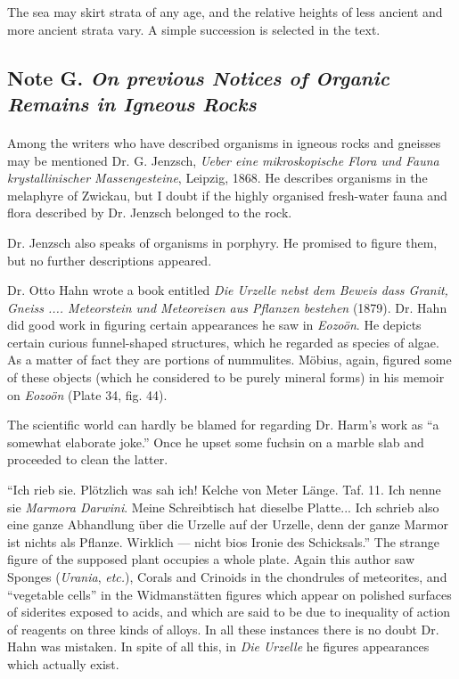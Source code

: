 \documentclass[a4paper, 12pt, oneside]{article}
\begin{document}
The sea may skirt strata of any age, and the relative heights of less ancient and more ancient strata vary. A simple succession is selected in the text.

\subsection{Note G. \emph{On previous Notices of Organic Remains in Igneous Rocks}}
\paragraph{}
Among the writers who have described organisms in igneous rocks and gneisses may be mentioned Dr. G. Jenzsch, \emph{Ueber eine mikroskopische Flora und Fauna krystallinischer Massengesteine}, Leipzig, 1868. He describes organisms in the melaphyre of Zwickau, but I doubt if the highly organised fresh-water fauna and flora described by Dr. Jenzsch belonged to the rock.

Dr. Jenzsch also speaks of organisms in porphyry. He promised to figure them, but no further descriptions appeared.

Dr. Otto Hahn wrote a book entitled \emph{Die Urzelle nebst dem Beweis dass Granit, Gneiss .... Meteorstein und Meteoreisen aus Pflanzen bestehen} (1879). Dr. Hahn did good work in figuring certain appearances he saw in \emph{Eozoön}. He depicts certain curious funnel-shaped structures, which he regarded as species of algae. As a matter of fact they are portions of nummulites. Möbius, again, figured some of these objects (which he considered to be purely mineral forms) in his memoir on \emph{Eozoön} (Plate 34, fig. 44).

The scientific world can hardly be blamed for regarding Dr. Harm's work as ``a somewhat elaborate joke.'' Once he upset some fuchsin on a marble slab and proceeded to clean the latter.

``Ich rieb sie. Plötzlich was sah ich! Kelche von Meter Länge. Taf. 11. Ich nenne sie \emph{Marmora Darwini}. Meine Schreibtisch hat dieselbe Platte... Ich schrieb also eine ganze Abhandlung über die Urzelle auf der Urzelle, denn der ganze Marmor ist nichts als Pflanze. Wirklich --- nicht bios Ironie des Schicksals.'' The strange figure of the supposed plant occupies a whole plate. Again this author saw Sponges (\emph{Urania}, \emph{etc.}), Corals and Crinoids in the chondrules of meteorites, and ``vegetable cells'' in the Widmanstätten figures which appear on polished surfaces of siderites exposed to acids, and which are said to be due to inequality of action of reagents on three kinds of alloys. In all these instances there is no doubt Dr. Hahn was mistaken. In spite of all this, in \emph{Die Urzelle} he figures appearances which actually exist.
\end{document}
